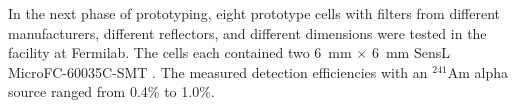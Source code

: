 

%


In the next phase of prototyping, eight prototype  cells with filters from different manufacturers, different reflectors, and different dimensions were tested in the  facility at Fermilab. 
The cells each contained two \SI{6}{mm} $\times$ \SI{6}{mm} SensL MicroFC-60035C-SMT .  
The measured detection efficiencies with an $^{241}$Am alpha source  ranged from 0.4\% to 1.0\%.

